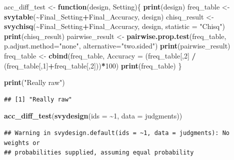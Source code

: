 \documentclass[
]{article}
\newenvironment{Shaded}{\begin{snugshade}}{\end{snugshade}}
\newcommand{\AttributeTok}[1]{\textcolor[rgb]{0.13,0.29,0.53}{#1}}
\newcommand{\ControlFlowTok}[1]{\textcolor[rgb]{0.13,0.29,0.53}{\textbf{#1}}}
\newcommand{\DecValTok}[1]{\textcolor[rgb]{0.00,0.00,0.81}{#1}}
\newcommand{\FunctionTok}[1]{\textcolor[rgb]{0.13,0.29,0.53}{\textbf{#1}}}
\newcommand{\NormalTok}[1]{#1}
\newcommand{\OtherTok}[1]{\textcolor[rgb]{0.56,0.35,0.01}{#1}}
\newcommand{\SpecialCharTok}[1]{\textcolor[rgb]{0.81,0.36,0.00}{\textbf{#1}}}
\newcommand{\StringTok}[1]{\textcolor[rgb]{0.31,0.60,0.02}{#1}}
\begin{document}
\begin{Shaded}
\begin{Highlighting}[]
\NormalTok{acc\_diff\_test }\OtherTok{\textless{}{-}} \ControlFlowTok{function}\NormalTok{(design, Setting)\{}
  \FunctionTok{print}\NormalTok{(design)}
\NormalTok{  freq\_table }\OtherTok{\textless{}{-}} \FunctionTok{svytable}\NormalTok{(}\SpecialCharTok{\textasciitilde{}}\NormalTok{Final\_Setting}\SpecialCharTok{+}\NormalTok{Final\_Accuracy, design)}
\NormalTok{  chisq\_result }\OtherTok{\textless{}{-}} \FunctionTok{svychisq}\NormalTok{(}\SpecialCharTok{\textasciitilde{}}\NormalTok{Final\_Setting}\SpecialCharTok{+}\NormalTok{Final\_Accuracy, design, }\AttributeTok{statistic =} \StringTok{"Chisq"}\NormalTok{)}
  \FunctionTok{print}\NormalTok{(chisq\_result)}
\NormalTok{  pairwise\_result }\OtherTok{\textless{}{-}} \FunctionTok{pairwise.prop.test}\NormalTok{(freq\_table, }\AttributeTok{p.adjust.method=}\StringTok{"none"}\NormalTok{, }\AttributeTok{alternative=}\StringTok{"two.sided"}\NormalTok{)}
  \FunctionTok{print}\NormalTok{(pairwise\_result)}
\NormalTok{  freq\_table }\OtherTok{\textless{}{-}} \FunctionTok{cbind}\NormalTok{(freq\_table, }\AttributeTok{Accuracy =}\NormalTok{ (freq\_table[,}\DecValTok{2}\NormalTok{] }\SpecialCharTok{/}\NormalTok{ (freq\_table[,}\DecValTok{1}\NormalTok{]}\SpecialCharTok{+}\NormalTok{freq\_table[,}\DecValTok{2}\NormalTok{]))}\SpecialCharTok{*}\DecValTok{100}\NormalTok{)}
  \FunctionTok{print}\NormalTok{(freq\_table)}
\NormalTok{\}}

\FunctionTok{print}\NormalTok{(}\StringTok{"Really raw"}\NormalTok{)}
\end{Highlighting}
\end{Shaded}

\begin{verbatim}
## [1] "Really raw"
\end{verbatim}

\begin{Shaded}
\begin{Highlighting}[]
\FunctionTok{acc\_diff\_test}\NormalTok{(}\FunctionTok{svydesign}\NormalTok{(}\AttributeTok{ids =} \SpecialCharTok{\textasciitilde{}}\DecValTok{1}\NormalTok{, }\AttributeTok{data =}\NormalTok{ judgments))}
\end{Highlighting}
\end{Shaded}

\begin{verbatim}
## Warning in svydesign.default(ids = ~1, data = judgments): No weights or
## probabilities supplied, assuming equal probability
\end{verbatim}
\end{document}
